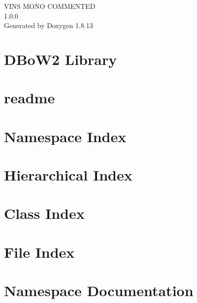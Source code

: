\documentclass[twoside]{book}
\newcommand{\+}{\discretionary{\mbox{\scriptsize$\hookleftarrow$}}{}{}}
\newcommand{\clearemptydoublepage}{%
  \newpage{\pagestyle{empty}\cleardoublepage}%
}
\begin{document}
\hypersetup{pageanchor=false,
             bookmarksnumbered=true,
             pdfencoding=unicode
            }
\begin{titlepage}
\vspace*{7cm}
\begin{center}%
{\Large V\+I\+NS M\+O\+NO C\+O\+M\+M\+E\+N\+T\+ED \\[1ex]\large 1.\+0.\+0 }\\
\vspace*{1cm}
{\large Generated by Doxygen 1.8.13}\\
\end{center}
\end{titlepage}
\clearemptydoublepage
{}
\tableofcontents
\clearemptydoublepage
{}
\hypersetup{pageanchor=true}

\chapter{D\+Bo\+W2 Library}
\label{index}\hypertarget{index}{}
\chapter{readme}
\label{md_camera_model_readme}

\chapter{Namespace Index}

\chapter{Hierarchical Index}

\chapter{Class Index}

\chapter{File Index}

\chapter{Namespace Documentation}



\end{document}
